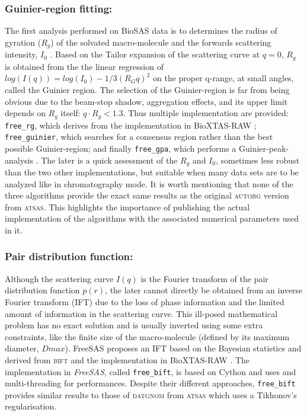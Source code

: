 \documentclass[preprint]{iucr}              %
\begin{document}
\subsubsection{Guinier-region fitting:}
The first analysis performed on BioSAS data is to determines the radius of gyration ($R_g$) of the solvated macro-molecule and the forwards scattering intensity, $I_0$ \cite{Guinier1955}.
Based on the Tailor expansion of the scattering curve at $q=0$, $R_g$ is obtained from the the linear regression of $log(I(q)) = log(I_0)-1/3 (R_{G}q)^{2}$ on the proper q-range, at small angles, called the Guinier region.
The selection of the Guinier-region is far from being obvious due to the beam-stop shadow, aggregation effects, and its upper limit depends on $R_g$ itself: $q \cdot R_g<1.3$.
Thus multiple implementation are provided: \texttt{free\_rg}, which derives from the implementation in BioXTAS-RAW \cite{bioxtasraw}; \texttt{free\_guinier}, which searches for a consensus region rather than the best possible Guinier-region; and finally \texttt{free\_gpa}, which performs a Guinier-peak-analysis \cite{gpa}. 
The later is a quick assessment of the $R_g$ and $I_0$, sometimes less robust than the two other implementations, but suitable when many data sets are to be analyzed like in chromatography mode.
It is worth mentioning that none of the three algorithms provide the exact same results as the original \textsc{autorg} \cite{ATSAS2} version from \textsc{atsas}. 
This highlights the importance of publishing the actual implementation of the algorithms with the associated numerical parameters used in it.
  
\subsubsection{Pair distribution function:}
Although the scattering curve $I(q)$ is the Fourier transform of the pair distribution function $p(r)$, the later cannot directly be obtained from an inverse Fourier transform (IFT) due to the loss of phase information and the limited amount of information in the scattering curve. 
This ill-posed mathematical problem has no exact solution and is usually inverted using some extra constraints, like the finite size of the macro-molecule (defined by its maximum diameter, $Dmax$).    
FreeSAS proposes an IFT based on the Bayesian statistics and derived from \textsc{bift} \cite{bift} and the implementation in BioXTAS-RAW \cite{BioXTAS}.
The implementation in \textit{FreeSAS}, called \texttt{free\_bift}, is based on Cython \cite{cython} and uses  \cite{blas} and multi-threading for performances.
Despite their different approaches, \texttt{free\_bift} provides similar results to those of \textsc{datgnom} \cite{ATSAS1} from \textsc{atsas} which uses a Tikhonov's regularisation.
\end{document}
